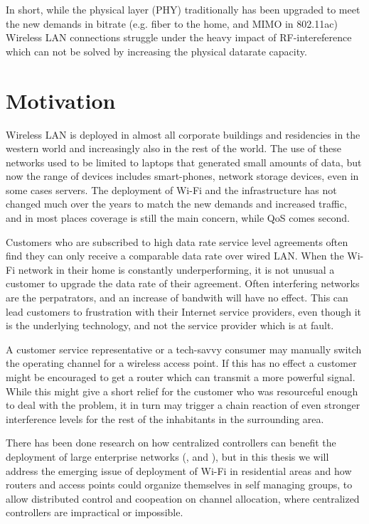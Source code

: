 In short, while the physical layer (PHY) traditionally has been upgraded to meet the new demands in bitrate (e.g. fiber to the home, 
and MIMO in 802.11ac) Wireless LAN connections struggle under the heavy impact of RF-intereference which can not be solved by increasing
the physical datarate capacity. 

\section{Motivation}
Wireless LAN is deployed in almost all corporate buildings and residencies in the western world and increasingly also in the rest of the world.
The use of these networks used to be limited to laptops that generated small amounts of data, but now the range of devices includes
smart-phones, network storage devices, even in some cases servers. The deployment of Wi-Fi and the infrastructure has not 
changed much over the years to match the new demands and increased traffic, and in most places coverage is still the main concern, while
QoS comes second. 

Customers who are subscribed to high data rate service level agreements often find they can only receive a comparable data rate over wired LAN.
When the Wi-Fi network in their home is constantly underperforming, it is not unusual a customer to upgrade the data rate of their agreement. Often interfering networks
are the perpatrators, and an increase of bandwith will have no effect. This can lead customers to frustration with their Internet service providers,
even though it is the underlying technology, and not the service provider which is at fault.

A customer service representative or a tech-savvy consumer may manually switch the operating channel for a wireless access point.
If this has no effect a customer might be encouraged to get a router which can transmit a more powerful signal. While this might give a short relief
for the customer who was resourceful enough to deal with the problem, it in turn may trigger a chain reaction of even stronger
interference levels for the rest of the inhabitants in the surrounding area. 

There has been done research on how centralized controllers can benefit the deployment of large enterprise networks (\cite{Murty}, \cite{Murty2} and \cite{Suresh}),
but in this thesis we will address the emerging issue of deployment of Wi-Fi in residential areas and how routers and access points could organize themselves in self managing groups, 
to allow distributed control and coopeation on channel allocation, where centralized controllers are impractical or impossible.


